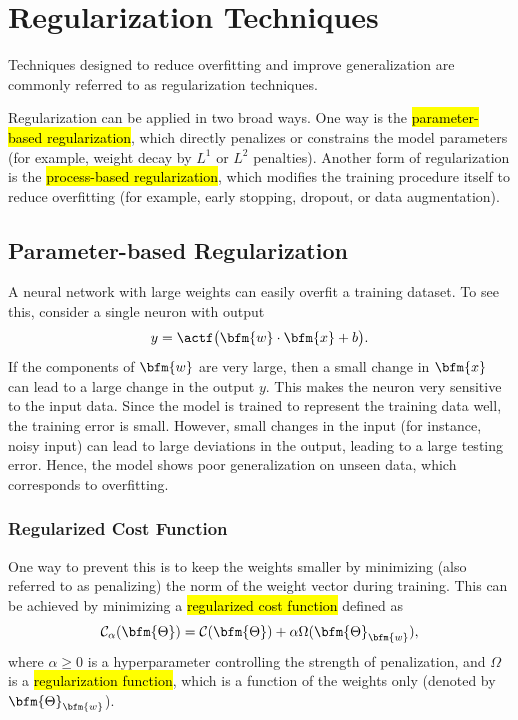 \section{Regularization Techniques}\label{regularization.techniques.sec}
Techniques designed to reduce overfitting and improve generalization are commonly referred to as regularization techniques.

Regularization can be applied in two broad ways. One way is the \hl{parameter-based regularization}, which directly penalizes or constrains the model parameters (for example, weight decay by $L^1$ or $L^2$ penalties). Another form of regularization is the \hl{process-based regularization}, which modifies the training procedure itself to reduce overfitting (for example, early stopping, dropout, or data augmentation).
\subsection{Parameter-based Regularization}\label{parameter.based.regularization.sec}
A neural network with large weights can easily overfit a training dataset. To see this, consider a single neuron with output
$$y = \actf\big(\bfm{w}\cdot \bfm{x} + b\big).$$
If the components of $\bfm{w}$ are very large, then a small change in $\bfm{x}$ can lead to a large change in the output $y$.  This makes the neuron very sensitive to the input data. Since the model is trained to represent the training data well, the training error is small. However, small changes in the input (for instance, noisy input) can lead to large deviations in the output, leading to a large testing error.  Hence, the model shows poor generalization on unseen data, which corresponds to overfitting.
\subsubsection{Regularized Cost Function}
One way to prevent this is to keep the weights smaller by minimizing (also referred to as penalizing) the norm of the weight vector during training. This can be achieved by minimizing a \hl{regularized cost function} defined as
$$
\mathcal{C}_{\alpha} (\bfm{\Theta}) = \mathcal{C}(\bfm{\Theta}) + \alpha \Omega(\bfm{\Theta}_{\bfm{w}}),
$$
where $\alpha\ge 0$ is a hyperparameter controlling the strength of penalization, and $\Omega$ is a \hl{regularization function}, which is a function of the weights only (denoted by $\bfm{\Theta}_{\bfm{w}}$).

